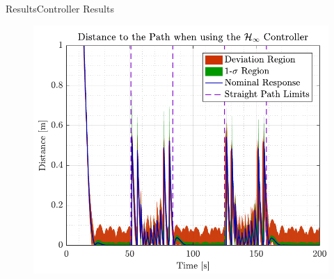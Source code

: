 \begin{frame}{Results}{Controller Results}
\begin{minipage}{0.45\linewidth}
\begin{figure}[H]
                \includegraphics[width=1\linewidth]{figures/dist_rob}
            \end{figure}             
        \end{minipage}\hfill \\    
\end{frame}




